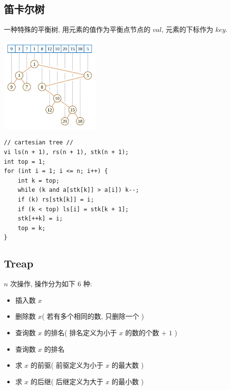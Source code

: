 \documentclass[UTF8, a4paper, titlepage, twoside]{ctexart}
\begin{document}
\subsection{ 笛卡尔树 }
一种特殊的平衡树, 用元素的值作为平衡点节点的 $val$, 元素的下标作为 $key$. 
\begin{center}
\includegraphics[width=5cm]{cartesian-tree1.png}
\end{center}
\begin{lstlisting}[style=cpp]
// cartesian tree //
vi ls(n + 1), rs(n + 1), stk(n + 1);
int top = 1;
for (int i = 1; i <= n; i++) {
    int k = top;
    while (k and a[stk[k]] > a[i]) k--;
    if (k) rs[stk[k]] = i;
    if (k < top) ls[i] = stk[k + 1];
    stk[++k] = i;
    top = k;
}
\end{lstlisting}

\subsection{ Treap }
$n$ 次操作, 操作分为如下 $6$ 种: 
\begin{itemize}
    \item 插入数 $x$
    \item 删除数 $x$( 若有多个相同的数, 只删除一个 )
    \item 查询数 $x$ 的排名( 排名定义为小于 $x$ 的数的个数 $+$ $1$ )
    \item 查询数 $x$ 的排名
    \item 求 $x$ 的前驱( 前驱定义为小于 $x$ 的最大数 )
    \item 求 $x$ 的后继( 后继定义为大于 $x$ 的最小数 )
\end{itemize}
\end{document}
